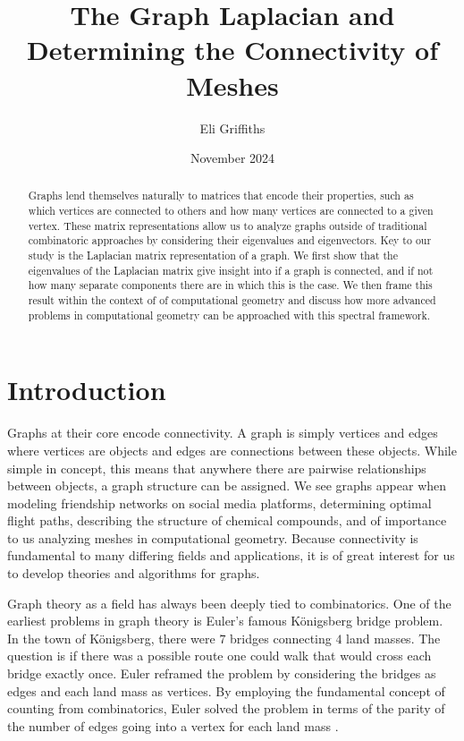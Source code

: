 \documentclass[11pt]{article}
\title{The Graph Laplacian and Determining the Connectivity of Meshes}
\author{Eli Griffiths}
\date{November 2024}
\begin{document}
\maketitle

\begin{abstract}
    Graphs lend themselves naturally to matrices that encode their properties, such as which vertices are connected to others and how many vertices are connected to a given vertex. These matrix representations allow us to analyze graphs outside of traditional combinatoric approaches by considering their eigenvalues and eigenvectors. Key to our study is the Laplacian matrix representation of a graph. We first show that the eigenvalues of the Laplacian matrix give insight into if a graph is connected, and if not how many separate components there are in which this is the case. We then frame this result within the context of of computational geometry and discuss how more advanced problems in computational geometry can be approached with this spectral framework.
\end{abstract}

\section{Introduction}

Graphs at their core encode connectivity. A graph is simply vertices and edges where vertices are objects and edges are connections between these objects. While simple in concept, this means that anywhere there are pairwise relationships between objects, a graph structure can be assigned. We see graphs appear when modeling friendship networks on social media platforms, determining optimal flight paths, describing the structure of chemical compounds, and of importance to us analyzing meshes in computational geometry. Because connectivity is fundamental to many differing fields and applications, it is of great interest for us to develop theories and algorithms for graphs.

Graph theory as a field has always been deeply tied to combinatorics. One of the earliest problems in graph theory is Euler's famous K\"onigsberg bridge problem. In the town of K\"onigsberg, there were $7$ bridges connecting $4$ land masses. The question is if there was a possible route one could walk that would cross each bridge exactly once. Euler reframed the problem by considering the bridges as edges and each land mass as vertices. By employing the fundamental concept of counting from combinatorics, Euler solved the problem in terms of the parity of the number of edges going into a vertex for each land mass \cite{wilson2013combinatorics}. %
\end{document}
